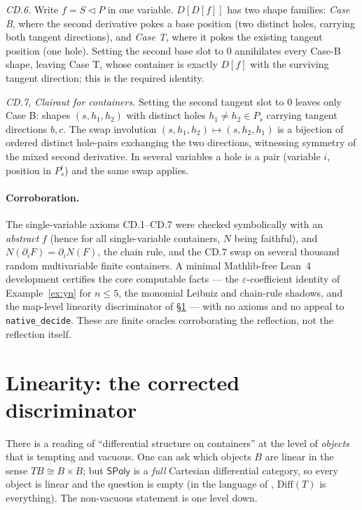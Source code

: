 \documentclass[11pt]{article}
\theoremstyle{definition}
\newcommand{\SPoly}{\mathsf{SPoly}}
\newcommand{\Diff}{\mathrm{Diff}}
\begin{document}
\emph{CD.6.} Write $f=S\lhd P$ in one variable. $D[D[f]]$ has two shape families: \emph{Case B}, where
the second derivative pokes a base position (two distinct holes, carrying both tangent directions),
and \emph{Case T}, where it pokes the existing tangent position (one hole). Setting the second base
slot to $0$ annihilates every Case-B shape, leaving Case T, whose container is exactly $D[f]$ with the
surviving tangent direction; this is the required identity.

\emph{CD.7, Clairaut for containers.} Setting the second tangent slot to $0$ leaves only Case B:
shapes $(s,h_1,h_2)$ with distinct holes $h_1\neq h_2\in P_s$ carrying tangent directions $b,c$. The
swap involution $(s,h_1,h_2)\mapsto(s,h_2,h_1)$ is a bijection of ordered distinct hole-pairs
exchanging the two directions, witnessing symmetry of the mixed second derivative. In several variables
a hole is a pair (variable $i$, position in $P^i_s$) and the same swap applies.

\paragraph{Corroboration.}
The single-variable axioms CD.1--CD.7 were checked symbolically with an \emph{abstract} $f$ (hence for
all single-variable containers, $N$ being faithful), and $N(\partial_iF)=\partial_iN(F)$, the chain
rule, and the CD.7 swap on several thousand random multivariable finite containers. A minimal
Mathlib-free Lean~4 development certifies the core computable facts --- the $\varepsilon$-coefficient
identity of Example~\ref{ex:yn} for $n\le5$, the monomial Leibniz and chain-rule shadows, and the
map-level linearity discriminator of \S\ref{sec:linear} --- with no axioms and no appeal to
\texttt{native\_decide}. These are finite oracles corroborating the reflection, not the reflection
itself.

\section{Linearity: the corrected discriminator}\label{sec:linear}

There is a reading of ``differential structure on containers'' at the level of \emph{objects} that is
tempting and vacuous. One can ask which objects $B$ are linear in the sense $TB\cong B\times B$; but
$\SPoly$ is a \emph{full} Cartesian differential category, so every object is linear and the question
is empty (in the language of \cite[Thm.~69]{CCGZ2024}, $\Diff(T)$ is everything). The non-vacuous
statement is one level down.
\end{document}
